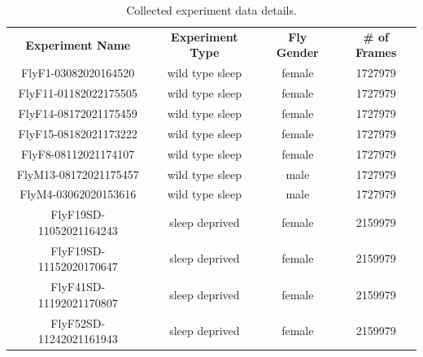 \begin{table}[htb!]
	\begin{adjustbox}{width=1\textwidth}
		\begin{tabular}{c c c c}
			\toprule
			\multicolumn{1}{c}{\textbf{Experiment Name}} & \multicolumn{1}{c}{\textbf{Experiment Type}} & \multicolumn{1}{c}{\textbf{Fly Gender}} & \multicolumn{1}{c}{\textbf{\# of Frames}} \\
			\cmidrule(lr){1-1}\cmidrule(lr){2-2}\cmidrule(lr){3-3}\cmidrule(lr){4-4}
			FlyF1-03082020164520                         & wild type sleep                              & female                                  & 1727979                                   \\
			FlyF11-01182022175505                        & wild type sleep                              & female                                  & 1727979                                   \\
			FlyF14-08172021175459                        & wild type sleep                              & female                                  & 1727979                                   \\
			FlyF15-08182021173222                        & wild type sleep                              & female                                  & 1727979                                   \\
			FlyF8-08112021174107                         & wild type sleep                              & female                                  & 1727979                                   \\
			FlyM13-08172021175457                        & wild type sleep                              & male                                    & 1727979                                   \\
			FlyM4-03062020153616                         & wild type sleep                              & male                                    & 1727979                                   \\
			FlyF19SD-11052021164243                      & sleep deprived                               & female                                  & 2159979                                   \\
			FlyF19SD-11152020170647                      & sleep deprived                               & female                                  & 2159979                                   \\
			FlyF41SD-11192021170807                      & sleep deprived                               & female                                  & 2159979                                   \\
			FlyF52SD-11242021161943                      & sleep deprived                               & female                                  & 2159979                                   \\
			\bottomrule
		\end{tabular}
	\end{adjustbox}
	\caption{Collected experiment data details. \label{table:experiment-details}}
\end{table}

